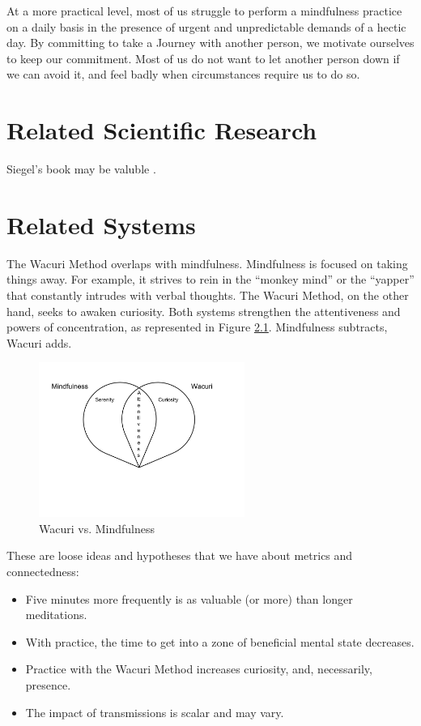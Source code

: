 \documentclass[12pt]{book}
\begin{document}
At a more practical level, most of us struggle to perform a
mindfulness practice on a daily basis in the presence of urgent and
unpredictable demands of a hectic day.  By committing to take a Journey
with another person, we motivate ourselves to keep our commitment. Most
of us do not want to let another person down if we can avoid it, and
feel badly when circumstances require us to do so.

\chapter{Related Scientific Research}

Siegel's book may be valuble \cite{siegel2007mindful}.


\chapter{Related Systems}

The Wacuri Method overlaps with mindfulness.  Mindfulness is focused
on taking things away. For example, it strives to rein in the
``monkey mind'' or the ``yapper'' that constantly intrudes with
verbal thoughts. The Wacuri Method, on the other hand, seeks
to awaken curiosity. Both systems strengthen the attentiveness
and powers of concentration, as represented in Figure \ref{fig:wacurivsmindfulness}. Mindfulness subtracts, Wacuri adds.

\begin{figure}
  \centering
     \includegraphics[width=0.6\textwidth]{WacuriFigures/WacuriMindfulnessDiagram.png}
     \caption{Wacuri vs. Mindfulness}
  \label{fig:wacurivsmindfulness}     
\end{figure}

These are loose ideas and hypotheses that we have about metrics and connectedness:
\begin{itemize}
\item Five minutes more frequently is as valuable (or more) than longer meditations.
\item With practice, the time to get into a zone of beneficial mental state decreases.
\item Practice with the Wacuri Method increases curiosity, and, necessarily, presence.
  \item The impact of transmissions is scalar and may vary.
\end{itemize}
\end{document}
